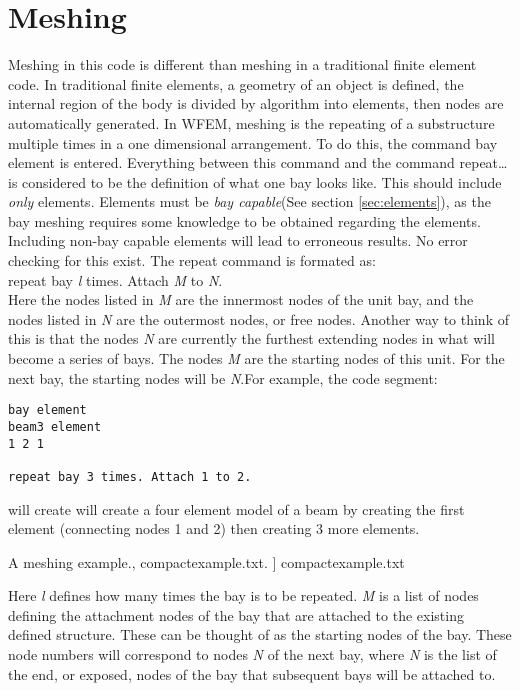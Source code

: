 \documentclass[12pt]{article}
\newcommand*{\sarg}[1]{\textit{#1}}
\newcommand*{\command}[1]{\textsf{#1}}
\newcommand*{\varg}[1]{\textit{#1}}
\newcommand{\includelisting}[2]{{\small\label{listing:#1}#2, #1. }]{ #1}}}
\begin{document}
\section{Meshing}
Meshing in this code is different than meshing in a traditional finite element code. In traditional finite elements, a geometry of an object is defined, the internal region of the body is divided by algorithm into elements, then  nodes are automatically generated. In WFEM, meshing is the repeating of a substructure multiple times in a one dimensional arrangement. To do this, the command \command{bay element} is entered.  Everything between this command and the command \command{repeat\ldots} is considered to be the definition of what one bay looks like. This should include \emph{only} elements. Elements must be \emph{bay capable}(See section \ref{sec:elements}), as the bay meshing requires some knowledge to be obtained regarding the elements. Including non-bay capable elements will lead to erroneous results. No error checking for this exist. The \command{repeat} command is formated as:\\
 \command{repeat bay} \sarg{l} \command{ times. Attach } \varg{M}
 \command{to} \varg{N}.\\
\noindent Here the nodes listed in \varg{M} are the innermost nodes of the unit bay, and the nodes listed in \varg{N} are the outermost nodes, or free nodes. Another way to think of this is that the nodes \varg{N} are currently the furthest extending nodes in what will become a series of bays. The nodes \varg{M} are the starting nodes of this unit. For the next bay, the starting nodes will be \varg{N}.For example, the code segment:
\begin{lstlisting}
bay element
beam3 element
1 2 1

repeat bay 3 times. Attach 1 to 2.
\end{lstlisting}
will create will create a four element model of a beam by creating the first element (connecting nodes 1 and 2) then creating 3 more elements.

%
 \includelisting{compactexample.txt}{A meshing example.}

 Here \sarg{l} defines how many times the bay is to be repeated.
 \varg{M} is a list of nodes defining the attachment nodes of the bay
 that are attached to the existing defined structure. These can be
 thought of as the starting nodes of the bay. These node numbers will
 correspond to nodes \varg{N} of the next bay, where \varg{N} is the
 list of the end, or exposed, nodes of the bay that subsequent bays
 will be attached to.
\end{document}
